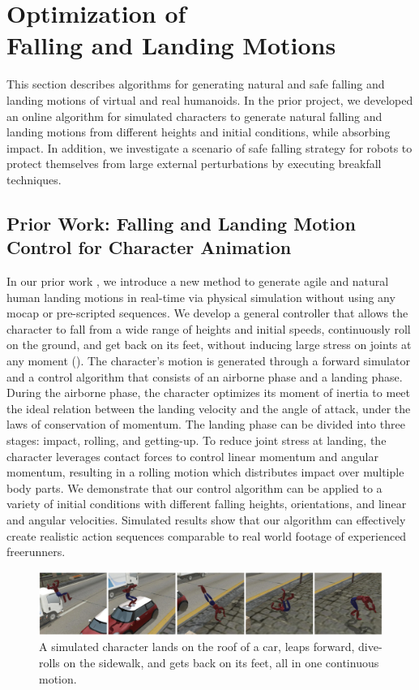 \chapter{Optimization of \protect\\ Falling and Landing Motions}

This section describes algorithms for generating natural and safe
falling and landing motions of virtual and real humanoids.
In the prior project, we developed an online algorithm for simulated 
characters to generate natural falling and landing motions from 
different heights and initial conditions, while absorbing impact.
In addition, we investigate a scenario of safe falling 
strategy for robots to protect themselves from large external 
perturbations by executing breakfall techniques.

\section{Prior Work: Falling and Landing Motion Control for Character Animation}

In our prior work \cite{Ha:2012:FAL}, 
we introduce a new method to generate agile and natural human landing
motions in real-time via physical simulation without using any mocap
or pre-scripted sequences. We develop a general controller that allows
the character to fall from a wide range of heights and initial speeds,
continuously roll on the ground, and get back on its feet, without
inducing large stress on joints at any moment 
().
The character's motion
is generated through a forward simulator and a control algorithm that
consists of an airborne phase and a landing phase. During the airborne
phase, the character optimizes its moment of inertia to meet the ideal
relation between the landing velocity and the angle of attack, under
the laws of conservation of momentum. The landing phase can be divided
into three stages: impact, rolling, and getting-up. To reduce joint
stress at landing, the character leverages contact forces to control
linear momentum and angular momentum, resulting in a rolling motion
which distributes impact over multiple body parts. We demonstrate that
our control algorithm can be applied to a variety of initial
conditions with different falling heights, orientations, and linear
and angular velocities. Simulated results show that our algorithm can
effectively create realistic action sequences comparable to real world
footage of experienced freerunners.

\begin{figure}[htbp]
\center
  \includegraphics[width=\linewidth]{images/falling1_teaser}
  \caption{A simulated character lands on the roof of a car, 
    leaps forward, dive-rolls on the sidewalk, 
    and gets back on its feet, all in one continuous motion.}
 \label{fig:landingOverview}
\end{figure}


